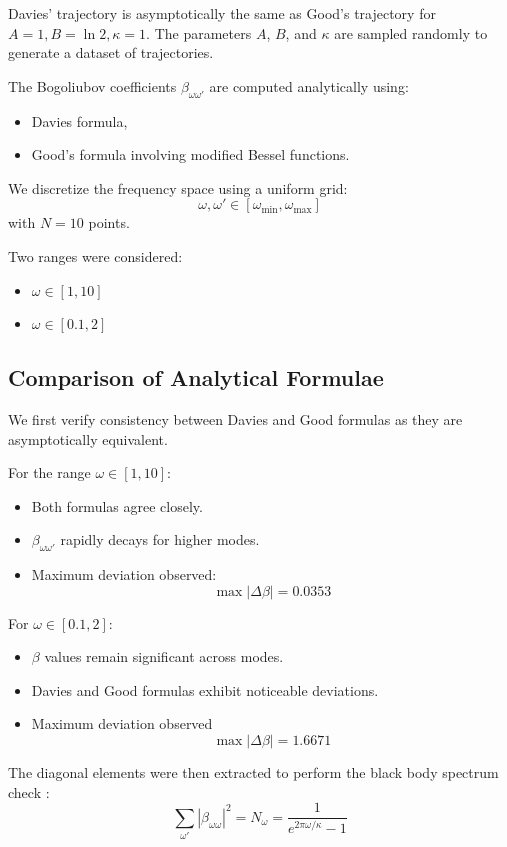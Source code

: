 Davies' trajectory is asymptotically the same as Good's trajectory for $A=1, B=\ln2, \kappa=1$. The parameters $A$, $B$, and $\kappa$ are sampled randomly to generate a dataset of trajectories.

The Bogoliubov coefficients $\beta_{\omega\omega'}$ are computed analytically using:

\begin{itemize}
    \item Davies formula,
    \item Good’s formula involving modified Bessel functions.
\end{itemize}

We discretize the frequency space using a uniform grid:
\[
\omega, \omega' \in [\omega_{\min}, \omega_{\max}]
\]
with $N=10$ points.

Two ranges were considered:
\begin{itemize}
    \item $\omega \in [1, 10]$
    \item $\omega \in [0.1, 2]$
\end{itemize}

\subsection{Comparison of Analytical Formulae}

We first verify consistency between Davies and Good formulas as they are asymptotically equivalent.

For the range $\omega \in [1,10]$:
\begin{itemize}
    \item Both formulas agree closely.
    \item $\beta_{\omega\omega'}$ rapidly decays for higher modes.
    \item Maximum deviation observed:
    \[
    \max |\Delta \beta| = 0.0353
    \]
\end{itemize}

For $\omega \in [0.1,2]$:
\begin{itemize}
    \item $\beta$ values remain significant across modes.
    \item Davies and Good formulas exhibit noticeable deviations.
    \item Maximum deviation observed \[
    \max |\Delta \beta| = 1.6671
    \]
\end{itemize}

The diagonal elements were then extracted to perform the black body spectrum check \cite{DaviesFulling1977}:
\[
\sum_{\omega'}|\beta_{\omega\omega}|^2 = N_{\omega} = \frac{1}{e^{2\pi\omega/\kappa} - 1}
\]

